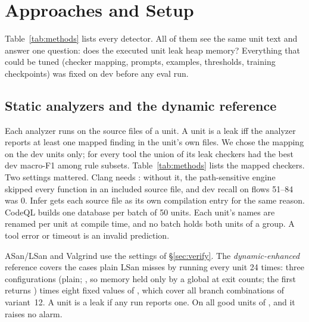 \section{Approaches and Setup}
\label{sec:methods}

Table~\ref{tab:methods} lists every detector.
All of them see the same \Deb{} unit text and answer one question: does the executed unit leak heap memory?
Everything that could be tuned (checker mapping, prompts, examples, thresholds, training checkpoints) was fixed on dev before any eval run.



\subsection{Static analyzers and the dynamic reference}
\label{sec:m-static}
Each analyzer runs on the source files of a unit.
A unit is a leak iff the analyzer reports at least one mapped finding in the unit's own files.
We chose the mapping on the dev units only; for every tool the union of its leak checkers had the best dev macro-F1 among rule subsets. %
Table~\ref{tab:methods} lists the mapped checkers.
Two settings mattered.
Clang needs : without it, the path-sensitive engine skipped every function in an included source file, and dev recall on flows 51--84 was 0.
Infer gets each source file as its own compilation entry for the same reason. %
CodeQL builds one database per batch of 50 units.
Each unit's  names are renamed per unit at compile time, and no batch holds both units of a group.
A tool error or timeout is an invalid prediction.

ASan/LSan and Valgrind use the settings of \S\ref{sec:verify}.
The \emph{dynamic-enhanced} reference covers the cases plain LSan misses by running every unit 24 times: three configurations (plain; , so memory held only by a global at exit counts; the first  returns ) times eight fixed values of , which cover all branch combinations of variant~12. %
A unit is a leak if any run reports one.
On all good units of \Deb, \Dead{} and \Plac{} it raises no alarm.

